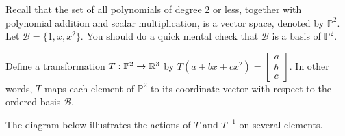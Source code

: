 \documentclass{ximera}
\begin{document}
\begin{example}\label{example:isomorph}
Recall that the set of all polynomials of degree $2$ or less, together with polynomial addition and scalar multiplication, is a vector space, denoted by $\mathbb{P}^2$.  Let $\mathcal{B}=\{1, x, x^2\}$. You should do a quick mental check that $\mathcal{B}$ is a basis of $\mathbb{P}^2$.

Define a transformation $T:\mathbb{P}^2\rightarrow \mathbb{R}^3$ by
$T(a+bx+cx^2)=\begin{bmatrix}a\\b\\c\end{bmatrix}$.  In other words, $T$ maps each element of $\mathbb{P}^2$ to its coordinate vector with respect to the ordered basis $\mathcal{B}$.  

The diagram below illustrates the actions of $T$ and $T^{-1}$ on several elements.
  
 \begin{center}
\end{center}
\end{example}
\end{document}
